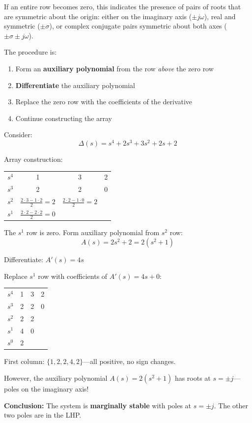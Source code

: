 If an entire row becomes zero, this indicates the presence of pairs of roots that are symmetric about the origin: either on the imaginary axis ($\pm j\omega$), real and symmetric ($\pm\sigma$), or complex conjugate pairs symmetric about both axes ($\pm\sigma \pm j\omega$).

The procedure is:
\begin{enumerate}
    \item Form an \textbf{auxiliary polynomial} from the row \textit{above} the zero row
    \item \textbf{Differentiate} the auxiliary polynomial
    \item Replace the zero row with the coefficients of the derivative
    \item Continue constructing the array
\end{enumerate}

\begin{example}
\label{ex:routh_row_zeros}
Consider:
\begin{equation}
\Delta(s) = s^4 + 2s^3 + 3s^2 + 2s + 2
\end{equation}

Array construction:
\begin{center}
\begin{tabular}{c|ccc}
$s^4$ & 1 & 3 & 2 \\
$s^3$ & 2 & 2 & 0 \\
$s^2$ & $\frac{2 \cdot 3 - 1 \cdot 2}{2} = 2$ & $\frac{2 \cdot 2 - 1 \cdot 0}{2} = 2$ & \\
$s^1$ & $\frac{2 \cdot 2 - 2 \cdot 2}{2} = 0$ & &
\end{tabular}
\end{center}

The $s^1$ row is zero. Form auxiliary polynomial from $s^2$ row:
\begin{equation}
A(s) = 2s^2 + 2 = 2(s^2 + 1)
\end{equation}

Differentiate: $A'(s) = 4s$

Replace $s^1$ row with coefficients of $A'(s) = 4s + 0$:
\begin{center}
\begin{tabular}{c|ccc}
$s^4$ & 1 & 3 & 2 \\
$s^3$ & 2 & 2 & 0 \\
$s^2$ & 2 & 2 & \\
$s^1$ & 4 & 0 & \\
$s^0$ & 2 & &
\end{tabular}
\end{center}

First column: $\{1, 2, 2, 4, 2\}$---all positive, no sign changes.

However, the auxiliary polynomial $A(s) = 2(s^2 + 1)$ has roots at $s = \pm j$---poles on the imaginary axis!

\textbf{Conclusion:} The system is \textbf{marginally stable} with poles at $s = \pm j$. The other two poles are in the LHP.
\end{example}

